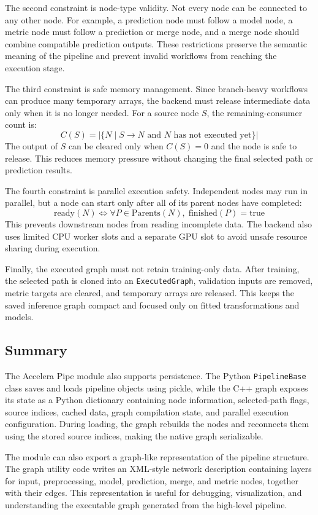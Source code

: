 The second constraint is node-type validity. Not every node can be connected to
any other node. For example, a prediction node must follow a model node, a metric
node must follow a prediction or merge node, and a merge node should combine
compatible prediction outputs. These restrictions preserve the semantic meaning
of the pipeline and prevent invalid workflows from reaching the execution stage.

The third constraint is safe memory management. Since branch-heavy workflows can
produce many temporary arrays, the backend must release intermediate data only
when it is no longer needed. For a source node \(S\), the remaining-consumer
count is:
\[
C(S) = |\{N \mid S \rightarrow N \text{ and } N \text{ has not executed yet}\}|
\]
The output of \(S\) can be cleared only when \(C(S)=0\) and the node is safe to
release. This reduces memory pressure without changing the final selected path
or prediction results.

The fourth constraint is parallel execution safety. Independent nodes may run in
parallel, but a node can start only after all of its parent nodes have completed:
\[
\text{ready}(N) \Longleftrightarrow \forall P \in \text{Parents}(N),\;
\text{finished}(P)=\text{true}
\]
This prevents downstream nodes from reading incomplete data. The backend also
uses limited CPU worker slots and a separate GPU slot to avoid unsafe resource
sharing during execution.

Finally, the executed graph must not retain training-only data. After training,
the selected path is cloned into an \texttt{ExecutedGraph}, validation inputs are
removed, metric targets are cleared, and temporary arrays are released. This
keeps the saved inference graph compact and focused only on fitted
transformations and models.


\subsection{Summary}
The Accelera Pipe module also supports persistence. The Python \texttt{PipelineBase}
class saves and loads pipeline objects using pickle, while the C++ graph exposes
its state as a Python dictionary containing node information, selected-path flags,
source indices, cached data, graph compilation state, and parallel execution
configuration. During loading, the graph rebuilds the nodes and reconnects them
using the stored source indices, making the native graph serializable.

The module can also export a graph-like representation of the pipeline structure.
The graph utility code writes an XML-style network description containing layers
for input, preprocessing, model, prediction, merge, and metric nodes, together
with their edges. This representation is useful for debugging, visualization,
and understanding the executable graph generated from the high-level pipeline.

